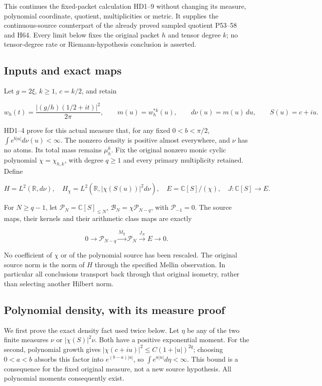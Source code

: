 
This continues the fixed-packet calculation HD1--9 without changing its measure, polynomial coordinate, quotient, multiplicities or metric. It supplies the continuous-source counterpart of the already proved sampled quotient P53--58 and H64. Every limit below fixes the original packet \(h\) and tensor degree \(k\); no tensor-degree rate or Riemann-hypothesis conclusion is asserted.

\subsection{Inputs and exact maps}\label{inputs-and-exact-maps}

Let \(g=2\xi\), \(k\ge1\), \(c=k/2\), and retain

\[
w_h(t)=\frac{|(g/h)(1/2+it)|^2}{2\pi},\qquad
m(u)=w_h^{*k}(u),\qquad d\nu(u)=m(u)\,du,\qquad S(u)=c+iu.
\tag{CR1}
\]

HD1--4 prove for this actual measure that, for any fixed \(0<b<\pi/2\), \(\int e^{b|u|}d\nu(u)<\infty\). The nonzero density is positive almost everywhere, and \(\nu\) has no atoms. Its total mass remains \(\mu_h^k\). Fix the original nonzero monic cyclic polynomial \(\chi=\chi_{h,k}\), with degree \(q\ge1\) and every primary multiplicity retained. Define

\[
H=L^2(\mathbb R,d\nu),\quad H_\chi=L^2(\mathbb R,|\chi(S(u))|^2d\nu),
\quad E=\mathbb C[S]/(\chi),\quad J:\mathbb C[S]\longrightarrow E.
\tag{CR2}
\]

For \(N\ge q-1\), let \(\mathcal P_N=\mathbb C[S]_{\le N}\), \(\mathcal B_N=\chi\mathcal P_{N-q}\), with \(\mathcal P_{-1}=0\). The source maps, their kernels and their arithmetic class maps are exactly

\[
0\longrightarrow\mathcal P_{N-q}\xrightarrow{M_\chi}
\mathcal P_N\xrightarrow{J_N}E\longrightarrow0.
\tag{CR3}
\]

No coefficient of \(\chi\) or of the polynomial source has been rescaled. The original source norm is the norm of \(H\) through the specified Mellin observation. In particular all conclusions transport back through that original isometry, rather than selecting another Hilbert norm.

\subsection{Polynomial density, with its measure proof}\label{polynomial-density-with-its-measure-proof}

We first prove the exact density fact used twice below. Let \(\eta\) be any of the two finite measures \(\nu\) or \(|\chi(S)|^2\nu\). Both have a positive exponential moment. For the second, polynomial growth gives \(|\chi(c+iu)|^2\le C(1+|u|)^{2q}\); choosing \(0<a<b\) absorbs this factor into \(e^{(b-a)|u|}\), so \(\int e^{a|u|}d\eta<\infty\). This bound is a consequence for the fixed original measure, not a new source hypothesis. All polynomial moments consequently exist.

